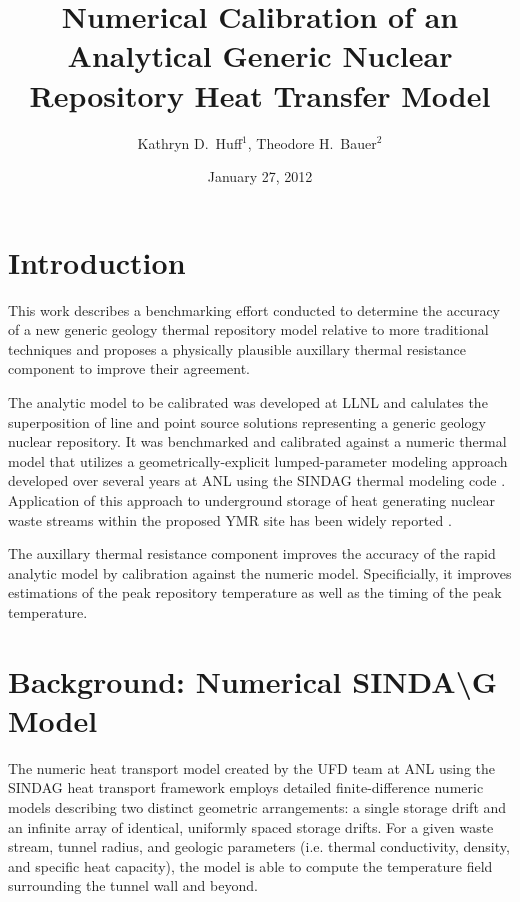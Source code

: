 \documentclass{article}
\title{Numerical Calibration of an Analytical Generic Nuclear Repository Heat 
Transfer Model}
\author{Kathryn D.~Huff$^1$, Theodore H.~Bauer$^2$}
\date{January 27, 2012}
\begin{document}
\section{Introduction}

This work describes a benchmarking effort conducted to determine the accuracy of 
a new generic geology thermal repository model
relative to more traditional techniques and proposes a physically plausible auxillary thermal 
resistance component to improve their agreement.  

The analytic model to be calibrated was developed at 
\gls{LLNL}\cite{hardin_generic_2011,sutton_investigations_2011,greenberg_application_2012} 
and calulates the superposition of line and point source solutions representing 
a generic geology nuclear repository. It was benchmarked and calibrated against 
a numeric thermal model that utilizes a geometrically-explicit 
lumped-parameter modeling approach developed over several years at \gls{ANL} 
using the \gls{SINDAG} thermal modeling code 
\cite{gaski_sinda_1987,gaski_sindag_1987}.  Application of this approach to 
underground storage of heat generating nuclear waste streams within the proposed 
\gls{YMR} site has been widely reported \cite{wigeland_separations_2006}. 

The auxillary thermal resistance component improves the accuracy of the rapid 
analytic model by calibration against the numeric model.  Specificially, it 
improves estimations of the peak repository temperature as well as the timing of 
the peak temperature. 





\section{Background: Numerical SINDA{\textbackslash}G Model}

The numeric heat transport model created by the \gls{UFD} team at \gls{ANL} 
using the \gls{SINDAG} heat transport framework employs detailed finite-difference numeric  
models describing two distinct geometric arrangements: a single 
storage drift and an infinite array of identical, uniformly spaced  storage drifts.  
For a given waste stream, tunnel radius, and geologic parameters (i.e. thermal conductivity, density, and 
specific heat capacity), the model is able to compute the temperature field 
surrounding the tunnel wall and beyond.  
\end{document}
